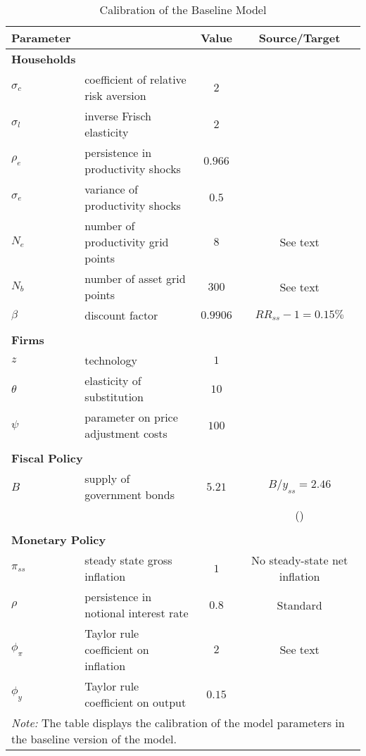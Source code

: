 \documentclass[12pt]{article} %
\numberwithin{equation}{section} %
\begin{document}
\begin{table}[t]
\centering
\caption{Calibration of the Baseline Model}
\label{tab:calibration-baseline}
\begin{tabular}{llcc}
Parameter &   &  Value & Source/Target \\
\hline
\hline
\multicolumn{2}{l}{\textbf{Households}} & & \\
$\sigma_c$ & coefficient of relative risk aversion & $2$ & \textcite{auclert2021} \\
$\sigma_l$ & inverse Frisch elasticity & $2$ & \textcite{auclert2021} \\
$\rho_e$ & persistence in productivity shocks & $0.966$ & \textcite{auclert2021} \\
$\sigma_e$ & variance of productivity shocks & $0.5$ & \textcite{auclert2021} \\
$N_e$ & number of productivity grid points & $8$ & See text \\
$N_b$ & number of asset grid points & $300$ & See text \\
$\beta$ &  discount factor & $0.9906$ & $RR_{ss}-1 = 0.15\%$ \\
& & & \\
\multicolumn{2}{l}{\textbf{Firms}} & & \\
$z$ &  technology & $1$ & \\
$\theta$ & elasticity of substitution & $10$ & \textcite{kaplan2018} \\
$\psi$ & parameter on price adjustment costs & $100$ & \textcite{kaplan2018} \\
& & & \\
\multicolumn{2}{l}{\textbf{Fiscal Policy}} & & \\
$B$ & supply of government bonds & $5.21$ & $B/y_{ss} = 2.46$ \\
& & & (\cite{bayer2023}) \\
& & & \\
\multicolumn{2}{l}{\textbf{Monetary Policy}} & & \\
$\pi_{ss}$ & steady state gross inflation & $1$ & No steady-state net inflation \\
$\rho$ & persistence in notional interest rate & $0.8$ & Standard \\
$\phi_{\pi}$ & Taylor rule coefficient on inflation & $2$ & See text \\
$\phi_{y}$ & Taylor rule coefficient on output & $0.15$ & \\
\hline
\multicolumn{4}{l}{\footnotesize \textit{Note:} The table displays the calibration of the model parameters in the baseline version of the model.}
\end{tabular}
\end{table}
\end{document}
